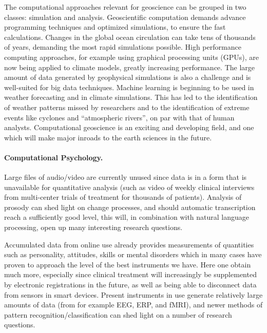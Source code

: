 \documentclass[%
oneside,                 %
final,                   %
10pt]{article}
\begin{document}
The computational approaches relevant for geoscience can be grouped in
two classes: simulation and analysis. Geoscientific computation
demands advance programming techniques and optimized simulations, to
ensure the fast calculations. Changes in the global ocean circulation
can take tens of thousands of years, demanding the most rapid
simulations possible. High performance computing approaches, for
example using graphical processing units (GPUs), are now being applied
to climate models, greatly increasing performance.  The large amount
of data generated by geophysical simulations is also a challenge and
is well-suited for big data techniques. Machine learning is beginning
to be used in weather forecasting and in climate simulations. This has
led to the identification of weather patterns missed by researchers
and to the identification of extreme events like cyclones and
“atmospheric rivers”, on par with that of human
analysts. Computational geoscience is an exciting and developing
field, and one which will make major inroads to the earth sciences in
the future.

\paragraph{Computational Psychology.}
Large files of audio/video are currently unused since data is in a
form that is unavailable for quantitative analysis (such as video of
weekly clinical interviews from multi-center trials of treatment for
thousands of patients). Analysis of prosody can shed light on change
processes, and should automatic transcription reach a sufficiently
good level, this will, in combination with natural language
processing, open up many interesting research questions.

Accumulated data from online use already provides measurements of
quantities such as personality, attitudes, skills or mental disorders
which in many cases have proven to approach the level of the best
instruments we have. Here one obtain much more, especially since
clinical treatment will increasingly be supplemented by electronic
registrations in the future, as well as being able to disconnect data
from sensors in smart devices. Present instruments in use generate
relatively large amounts of data (from for example EEG, ERP, and fMRI), and newer
methods of pattern recognition/classification can shed light on a
number of research questions.
\end{document}
